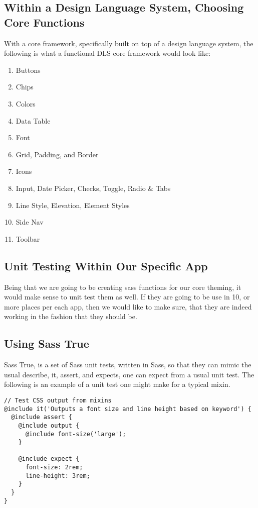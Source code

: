 \subsection{ Within a Design Language System, Choosing Core Functions }
With a core framework, specifically built on top of a design language system,
the following is what a functional DLS core framework would look like:
\begin{enumerate}
  \item Buttons
  \item Chips
  \item Colors
  \item Data Table
  \item Font
  \item Grid, Padding, and Border
  \item Icons
  \item Input, Date Picker, Checks, Toggle, Radio \& Tabs
  \item Line Style, Elevation, Element Styles
  \item Side Nav
  \item Toolbar
\end{enumerate}

\subsection{ Unit Testing Within Our Specific App }
Being that we are going to be creating sass functions for our core theming, it
would make sense to unit test them as well. If they are going to be use in 10,
or more places per each app, then we would like to make sure, that they are
indeed working in the fashion that they should be.

\subsection{ Using Sass True }
Sass True, is a set of Sass unit tests, written in Sass, so that they can mimic
the usual describe, it, assert, and expects, one can expect from a usual
unit test. The following is an example of a unit test one might make for a
typical mixin.

\begin{lstlisting}
// Test CSS output from mixins
@include it('Outputs a font size and line height based on keyword') {
  @include assert {
    @include output {
      @include font-size('large');
    }

    @include expect {
      font-size: 2rem;
      line-height: 3rem;
    }
  }
}
\end{lstlisting}

